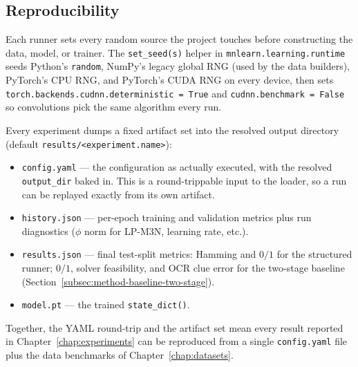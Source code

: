 \subsection{Reproducibility}
\label{subsec:method-reproducibility}

Each runner sets every random source the project touches before
constructing the data, model, or trainer. The
\texttt{set\_seed(s)} helper in
\texttt{mnlearn.learning.runtime} seeds Python's
\texttt{random}, NumPy's legacy global RNG (used by the data
builders), PyTorch's CPU RNG, and PyTorch's CUDA RNG on every
device, then sets
\texttt{torch.backends.cudnn.deterministic = True} and
\texttt{cudnn.benchmark = False} so convolutions pick the same
algorithm every run.

Every experiment dumps a fixed artifact set into the resolved
output directory (default \texttt{results/<experiment.name>}):
\begin{itemize}
    \item \texttt{config.yaml} --- the configuration as
    actually executed, with the resolved \texttt{output\_dir}
    baked in. This is a round-trippable input to the loader,
    so a run can be replayed exactly from its own artifact.
    \item \texttt{history.json} --- per-epoch training and
    validation metrics plus run diagnostics ($\phi$ norm for
    LP-M3N, learning rate, etc.).
    \item \texttt{results.json} --- final test-split metrics:
    Hamming and $0/1$ for the structured runner; $0/1$, solver
    feasibility, and OCR clue error for the two-stage baseline
    (Section~\ref{subsec:method-baseline-two-stage}).
    \item \texttt{model.pt} --- the trained
    \texttt{state\_dict()}.
\end{itemize}

Together, the YAML round-trip and the artifact set mean every
result reported in Chapter~\ref{chap:experiments} can be
reproduced from a single \texttt{config.yaml} file plus the
data benchmarks of Chapter~\ref{chap:datasets}.
